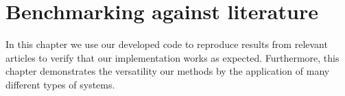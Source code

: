 \chapter{Benchmarking against literature}
    In this chapter we use our developed code to reproduce results from relevant
    articles to verify that our implementation works as expected.
    Furthermore, this chapter demonstrates the versatility our methods by the
    application of many different types of systems.
